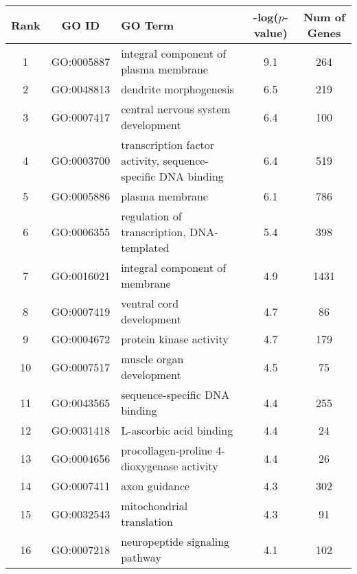 \centering \begin{tabular}{c|c|p{4in}|c|c}
Rank	&GO ID	&GO Term	&-log($p$-value)	&Num of Genes\\\hline
1	&GO:0005887	&integral component of plasma membrane	&9.1	&264\\
2	&GO:0048813	&dendrite morphogenesis	&6.5	&219\\
3	&GO:0007417	&central nervous system development	&6.4	&100\\
4	&GO:0003700	&transcription factor activity, sequence-specific DNA binding	&6.4	&519\\
5	&GO:0005886	&plasma membrane	&6.1	&786\\
6	&GO:0006355	&regulation of transcription, DNA-templated	&5.4	&398\\
7	&GO:0016021	&integral component of membrane	&4.9	&1431\\
8	&GO:0007419	&ventral cord development	&4.7	&86\\
9	&GO:0004672	&protein kinase activity	&4.7	&179\\
10	&GO:0007517	&muscle organ development	&4.5	&75\\
11	&GO:0043565	&sequence-specific DNA binding	&4.4	&255\\
12	&GO:0031418	&L-ascorbic acid binding	&4.4	&24\\
13	&GO:0004656	&procollagen-proline 4-dioxygenase activity	&4.4	&26\\
14	&GO:0007411	&axon guidance	&4.3	&302\\
15	&GO:0032543	&mitochondrial translation	&4.3	&91\\
16	&GO:0007218	&neuropeptide signaling pathway	&4.1	&102\\
\end{tabular}

